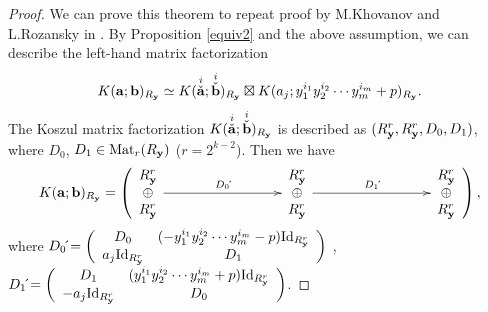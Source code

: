 \documentclass[10pt]{amsart}
\theoremstyle{break}
\begin{document}
\begin{proof}
We can prove this theorem to repeat proof by M.Khovanov and L.Rozansky in \cite{KR3}\cite{Yone1}.
By Proposition \ref{equiv2} and the above assumption, we can describe the left-hand matrix factorization 
$$
K(\mathbf{a};\mathbf{b})_{R_{\bf y}} \simeq K(\stackrel{i}{\check{\mathbf{a}}};\stackrel{i}{\check{\mathbf{b}}})_{R_{\bf y}} \boxtimes K(a_j;y_1^{i_1}y_2^{i_2}\cdots y_m^{i_m} + p)_{R_{\bf y}}.
$$
The Koszul matrix factorization $K(\stackrel{i}{\check{\mathbf{a}}};\stackrel{i}{\check{\mathbf{b}}})_{R_{\bf y}}$ is described as $(R_{{\bf y}}^r,R_{{\bf y}}^r,D_0,D_1)$, where $D_0$, $D_1 \in {{\mathrm{Mat}}}_r(R_{\bf y})$ ($r=2^{k-2}$).
Then we have
$$
K(\mathbf{a};\mathbf{b})_{R_{\bf y}}=
\left(
\xymatrix{
*{
\begin{array}{c}
R_{\bf y}^r\\
\oplus\\
R_{\bf y}^r
\end{array}
}
\ar[rrr]^{D_0 \acute{}}&&&
*{
\begin{array}{c}
R_{\bf y}^r\\
\oplus\\
R_{\bf y}^r
\end{array}
}
\ar[rrr]^{D_1 \acute{}
}&&&
*{
\begin{array}{c}
R_{\bf y}^r\\
\oplus\\
R_{\bf y}^r
\end{array}
}
}
\right)
,$$
where $D_0 \acute{} =\left(
\begin{array}{cc}
D_0&(-y_1^{i_1}y_2^{i_2}\cdots y_m^{i_m} -p) {{\mathrm{Id}}}_{R_{\bf y}^r}\\
a_j {{\mathrm{Id}}}_{R_{\bf y}^r}&D_1
\end{array}
\right)$
,
$D_1 \acute{}=\left(
\begin{array}{cc}
D_1&(y_1^{i_1}y_2^{i_2}\cdots y_m^{i_m}+ p) {{\mathrm{Id}}}_{R_{\bf y}^r}\\
-a_j {{\mathrm{Id}}}_{R_{\bf y}^r}&D_0
\end{array}
\right)$.


\end{proof}
\end{document}
